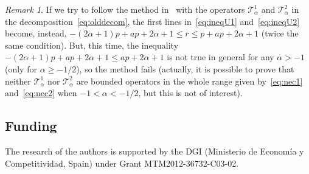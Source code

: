 \documentclass[a4paper]{amsart}
\numberwithin{equation}{section}
\theoremstyle{plain}
\theoremstyle{remark}
\newtheorem*{remark}{Remark}
\newcommand{\Ta}{\mathcal{T}_\alpha} %
\begin{document}
\begin{remark}
If we try to follow the method in~\cite{BCV} with the operators $\Ta^1$ and $\Ta^2$ in the decomposition~\eqref{eq:olddecom}, the first lines in~\eqref{eq:ineqU1} and~\eqref{eq:ineqU2} become, instead, $-(2\alpha+1)p + ap + 2\alpha+1 \le r \le p + ap + 2\alpha+1$ (twice the same condition). But, this time, the inequality $-(2\alpha+1)p + ap + 2\alpha+1 \le ap + 2\alpha+1$ is not true in general for any $\alpha > -1$ (only for $\alpha \ge -1/2$), so the method fails (actually, it is possible to prove that neither $\Ta^1$ nor $\Ta^2$ are bounded operators in the whole range given by~\eqref{eq:nec1} and~\eqref{eq:nec2} when $-1 < \alpha < -1/2$, but this is not of interest).
\end{remark}

\subsection*{Funding}
The research of the authors is supported by the DGI 
(Mi\-nis\-te\-rio de Eco\-no\-m\'ia y Com\-pe\-ti\-ti\-vi\-dad, Spain)
under Grant MTM2012-36732-C03-02.


\end{document}
